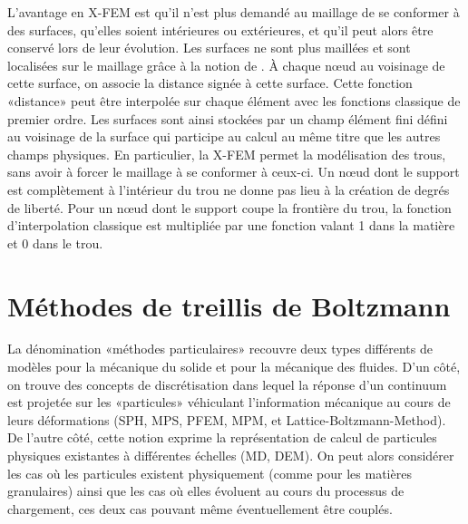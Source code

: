 \medskip
L'avantage en X-FEM est qu'il n'est plus demandé au maillage de se conformer à des surfaces, qu'elles soient intérieures ou extérieures, et qu'il peut alors être conservé lors de leur évolution. Les surfaces ne sont plus maillées et sont localisées sur le maillage grâce à la notion de . À chaque nœud au voisinage de cette surface, on associe la distance signée à cette surface. Cette fonction «distance» peut être interpolée sur chaque élément avec les fonctions classique de premier ordre. Les surfaces sont ainsi stockées par un champ élément fini défini au voisinage de la surface qui participe au calcul au même titre que les autres champs physiques. En particulier, la X-FEM permet la modélisation des trous, sans avoir à forcer le maillage à se conformer à ceux-ci. Un nœud dont le support est complètement à l'intérieur du trou ne donne pas lieu à la création de degrés de liberté. Pour un nœud dont le support coupe la frontière du trou, la fonction d'interpolation classique est multipliée par une fonction valant 1 dans la matière et 0 dans le trou.


\medskip
\section{Méthodes de treillis de Boltzmann}\label{Sec-PBM}

La dénomination «méthodes particulaires» recouvre deux types différents de modèles pour la mécanique du solide et pour la mécanique des fluides. D'un côté, on trouve des concepts de discrétisation dans lequel la réponse d'un continuum est projetée sur les «particules» véhiculant l'information mécanique au cours de leurs déformations (SPH, MPS, PFEM, MPM, et Lattice-Boltzmann-Method). De l'autre côté, cette notion exprime la représentation de calcul de particules physiques existantes à différentes échelles (MD, DEM). On peut alors considérer les cas où les particules existent physiquement (comme pour les matières granulaires) ainsi que les cas où elles évoluent au cours du processus de chargement, ces deux cas pouvant même éventuellement être couplés.

